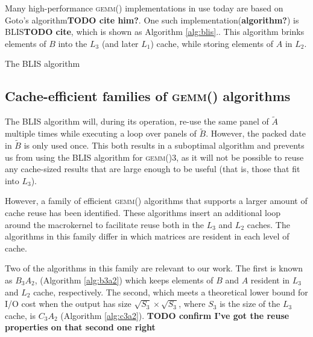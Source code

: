\documentclass[12pt]{article}
\newcommand*{\TO}{\textbf{to}}
\newcommand*{\gemm}{{\textsc{gemm()}}}
\begin{document}
Many high-performance \gemm{} implementations in use today are based on Goto's algorithm\textbf{TODO cite him?}.
One such implementation(\textbf{algorithm?}) is BLIS\textbf{TODO cite}, which is shown as Algorithm \ref{alg:blis}..
This algorithm brinks elements of $B$ into the $L_3$ (and later $L_1$) cache, while storing elements of $A$ in $L_2$.
\begin{algorithm}
  \caption{The BLIS algorithm}
  \label{alg:blis}
  \begin{tikzpicture}
    
  \end{tikzpicture}
  \begin{algorithmic}
    \For{$j \gets 0, n_C, \ldots$ \TO{} $n$}
    \For{$p \gets 0, k_C, \ldots$ \TO{} $k$}
    \For{$i \gets 0, m_C, \ldots$ \TO{} $m$}
    \EndFor{}
    \EndFor{}
    \EndFor{}
    \EndProcedure{}
  \end{algorithmic}
\end{algorithm}

\subsection{Cache-efficient families of \gemm{} algorithms}\label{subsec:cache-family}
The BLIS algorithm will, during its operation, re-use the same panel of $\tilde{A}$ multiple times while executing a loop over panels of $\tilde{B}$.
However, the packed date in $\tilde{B}$ is only used once.
This both results in a suboptimal algorithm and prevents us from using the BLIS algorithm for \gemm3{}, as it will not be possible to reuse any cache-sized results that are large enough to be useful (that is, those that fit into $L_3$).

However, a family of efficient \gemm{} algorithms that supports a larger amount of cache reuse has been identified\cite{Gunnels2006,SmithDiss2017}.
These algorithms insert an additional loop around the macrokernel to facilitate reuse both in the $L_3$ and $L_2$ caches.
The algorithms in this family differ in which matrices are resident in each level of cache.

Two of the algorithms in this family are relevant to our work.
The first is known as $B_3A_2$, (Algorithm \ref{alg:b3a2}) which keeps elements of $B$ and $A$ resident in $L_3$ and $L_2$ cache, respectively.
The second, which meets a theoretical lower bound for I/O cost when the output has size $\sqrt{S_3} \times \sqrt{S_3}$, where $S_3$ is the size of the $L_3$ cache\cite{Smith2017}, is $C_3A_2$ (Algorithm \ref{alg:c3a2}). \textbf{TODO confirm I've got the reuse properties on that second one right}
\end{document}
